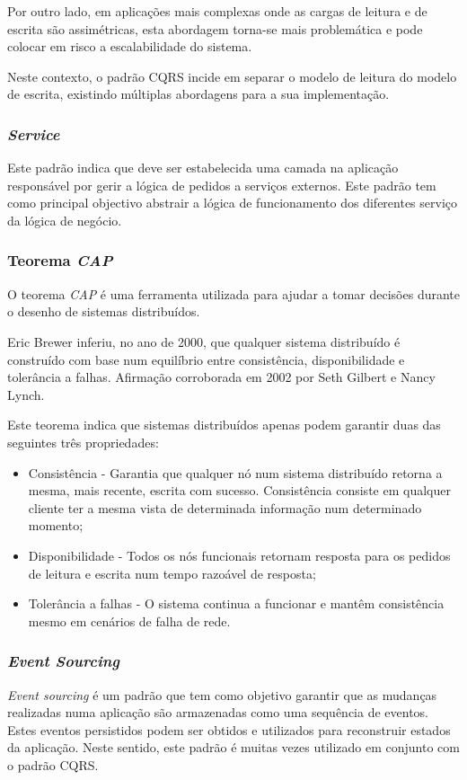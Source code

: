 Por outro lado, em aplicações mais complexas onde as cargas de leitura e de escrita são assimétricas, esta abordagem torna-se mais problemática e pode colocar em risco a escalabilidade do sistema.

Neste contexto, o padrão CQRS incide em separar o modelo de leitura do modelo de escrita, existindo múltiplas abordagens para a sua implementação\cite{cqrs}.

\subsubsection*{\emph{Service} \label{service_pattern}}
Este padrão indica que deve ser estabelecida uma camada na aplicação responsável por gerir a lógica de pedidos a serviços externos. Este padrão tem como principal objectivo abstrair a lógica de funcionamento dos diferentes serviço da lógica de negócio\cite{service_design_patterns}.

\subsubsection*{Teorema \emph{\acrfull{CAP}}} \label{cap_theorem}
O teorema \emph{\acrshort{CAP}} é uma ferramenta utilizada para ajudar a tomar decisões durante o desenho de sistemas distribuídos.

Eric Brewer inferiu, no ano de 2000, que qualquer sistema distribuído é construído com base num equilíbrio entre consistência, disponibilidade e tolerância a falhas. Afirmação corroborada em 2002 por Seth Gilbert e Nancy Lynch.

Este teorema indica que sistemas distribuídos apenas podem garantir duas das seguintes três propriedades\cite{cap_theorem}:

\begin{itemize}
    \item Consistência - Garantia que qualquer nó num sistema distribuído retorna a mesma, mais recente, escrita com sucesso. Consistência consiste em qualquer cliente ter a mesma vista de determinada informação num determinado momento;
    \item Disponibilidade - Todos os nós funcionais retornam resposta para os pedidos de leitura e escrita num tempo razoável de resposta;
    \item Tolerância a falhas - O sistema continua a funcionar e mantêm consistência mesmo em cenários de falha de rede.
\end{itemize}

\subsubsection*{\emph{Event Sourcing} \label{event_sourcing}}
\emph{Event sourcing} é um padrão que tem como objetivo garantir que as mudanças realizadas numa aplicação são armazenadas como uma sequência de eventos. Estes eventos persistidos podem ser obtidos e utilizados para reconstruir estados da aplicação.
Neste sentido, este padrão é muitas vezes utilizado em conjunto com o padrão CQRS\cite{event_sourcing}.

